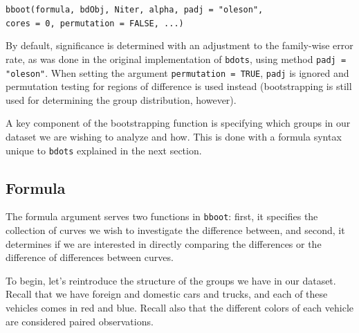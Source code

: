 \documentclass{article}
\newcommand{\xt}{\texttt}%
\begin{document}
\begin{center}
\tt bboot(formula, bdObj, Niter, alpha,   padj = "oleson", \\ cores = 0, permutation = FALSE, ...)
\end{center}

By default, significance is determined with an adjustment to the family-wise error rate, as was done in the original implementation of \xt{bdots}, using method \xt{padj = "oleson"}. When setting the argument \xt{permutation = TRUE}, \xt{padj} is ignored and permutation testing for regions of difference is used instead (bootstrapping is still used for determining the group distribution, however).

A key component of the bootstrapping function is specifying which groups in our dataset we are wishing to analyze and how. This is done with a formula syntax unique to \xt{bdots} explained in the next section.

\subsection{Formula}


The formula argument serves two functions in \xt{bboot}: first, it specifies the collection of curves we wish to investigate the difference between, and second, it determines if we are interested in directly comparing the differences or the difference of differences between curves. 

To begin, let's reintroduce the structure of the groups we have in our dataset. Recall that we have foreign and domestic cars and trucks, and each of these vehicles comes in red and blue. Recall also that the different colors of each vehicle are considered paired observations.

\end{document}
